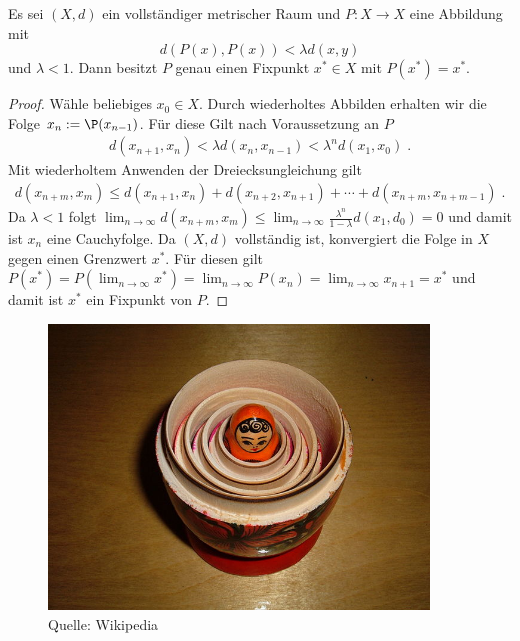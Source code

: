 \begin{Satz}
\end{Satz}
Es sei $(X,d)$ ein vollständiger metrischer Raum und $P: X \to X$ eine Abbildung mit $$d(P(x), P(x)) < \lambda d(x,y)$$ und $\lambda < 1$. Dann besitzt $P$ genau einen Fixpunkt $x^* \in X$ mit $P(x^*) = x^*$.
\begin{proof}
Wähle beliebiges $x_0 \in X$. Durch wiederholtes Abbilden erhalten wir die Folge  $x_n:= \P(x_{n-1})$. Für diese Gilt nach Voraussetzung an $P$
\begin{align*}
d(x_{n+1} , x_{n}) < \lambda d(x_{n} , x_{n-1})   < \lambda^n d(x_{1} , x_{0})  \; .
\end{align*}
Mit wiederholtem Anwenden der Dreiecksungleichung gilt 
\begin{align*}
d(x_{n + m} , x_{ m}) \leq d(x_{n+1} , x_{n})  +  d(x_{n +2} , x_{n +1}) +   \cdots   +  d(x_{n + m } , x_{n +m -1}) \; .
\end{align*}
Da $\lambda < 1$ folgt $  \lim_{n \to \infty} d(x_{n + m} , x_{ m})   \leq  \lim_{n \to \infty} \frac{\lambda^n}{1 - \lambda} d(x_{1} , d_{0}) = 0$ und damit ist $x_n$ eine Cauchyfolge.  Da $(X,d)$ vollständig ist, konvergiert die Folge in $X$ gegen einen Grenzwert $x^*$. Für diesen gilt $P(x^*) =  P (  \lim_{n \to \infty}  x^*) =  \lim_{n \to \infty} P(x_n)  =  \lim_{n \to \infty} x_{n+1} = x^*$ und damit ist $x^*$ ein Fixpunkt von $P$.
\end{proof}
\begin{figure}[H]
      \centering
    \includegraphics[width=0.9\textwidth]{images/640px-Floral_matryoshka_set_2_smallest_doll_nested.JPG}
\caption{Quelle: Wikipedia}
\end{figure}

